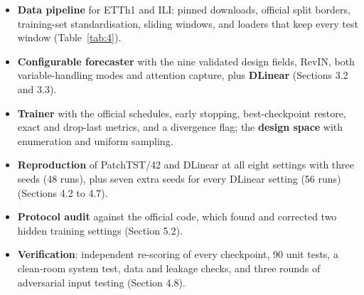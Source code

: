\documentclass[11pt,letterpaper]{article}
\begin{document}
\begin{itemize}
\item \textbf{Data pipeline} for ETTh1 and ILI: pinned downloads, official split borders, training-set standardisation, sliding windows, and loaders that keep every test window (Table~\ref{tab:4}).
\item \textbf{Configurable forecaster} with the nine validated design fields, RevIN, both variable-handling modes and attention capture, plus \textbf{DLinear} (Sections 3.2 and 3.3).
\item \textbf{Trainer} with the official schedules, early stopping, best-checkpoint restore, exact and drop-last metrics, and a divergence flag; the \textbf{design space} with enumeration and uniform sampling.
\item \textbf{Reproduction} of PatchTST/42 and DLinear at all eight settings with three seeds (48 runs), plus seven extra seeds for every DLinear setting (56 runs) (Sections 4.2 to 4.7).
\item \textbf{Protocol audit} against the official code, which found and corrected two hidden training settings (Section 5.2).
\item \textbf{Verification}: independent re-scoring of every checkpoint, 90 unit tests, a clean-room system test, data and leakage checks, and three rounds of adversarial input testing (Section 4.8).
\end{itemize}
\end{document}
